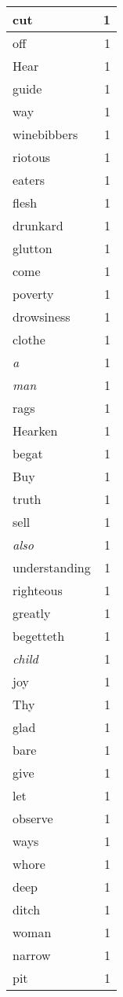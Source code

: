 \begin{center}
\begin{longtable}{l|r}
cut & 1\\ \hline 
off & 1\\ \hline 
Hear & 1\\ \hline 
guide & 1\\ \hline 
way & 1\\ \hline 
winebibbers & 1\\ \hline 
riotous & 1\\ \hline 
eaters & 1\\ \hline 
flesh & 1\\ \hline 
drunkard & 1\\ \hline 
glutton & 1\\ \hline 
come & 1\\ \hline 
poverty & 1\\ \hline 
drowsiness & 1\\ \hline 
clothe & 1\\ \hline 
\emph{a} & 1\\ \hline 
\emph{man} & 1\\ \hline 
rags & 1\\ \hline 
Hearken & 1\\ \hline 
begat & 1\\ \hline 
Buy & 1\\ \hline 
truth & 1\\ \hline 
sell & 1\\ \hline 
\emph{also} & 1\\ \hline 
understanding & 1\\ \hline 
righteous & 1\\ \hline 
greatly & 1\\ \hline 
begetteth & 1\\ \hline 
\emph{child} & 1\\ \hline 
joy & 1\\ \hline 
Thy & 1\\ \hline 
glad & 1\\ \hline 
bare & 1\\ \hline 
give & 1\\ \hline 
let & 1\\ \hline 
observe & 1\\ \hline 
ways & 1\\ \hline 
whore & 1\\ \hline 
deep & 1\\ \hline 
ditch & 1\\ \hline 
woman & 1\\ \hline 
narrow & 1\\ \hline 
pit & 1\\ \hline 

\end{longtable}
\end{center}
